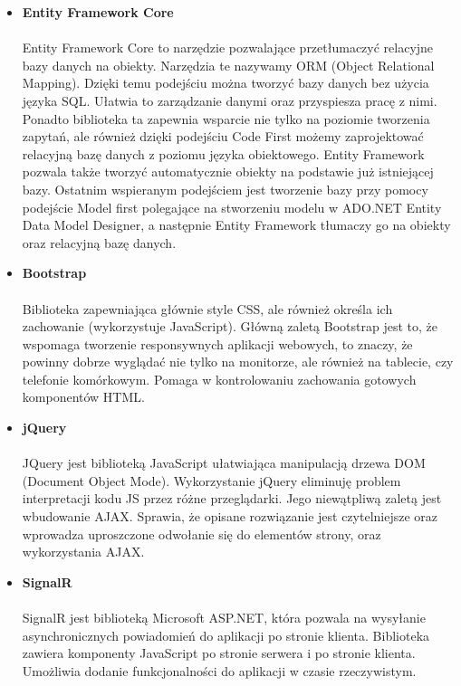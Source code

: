 \documentclass{article}
\begin{document}
\begin{itemize}
\item \textbf{Entity Framework Core} \\\\
Entity Framework Core to narzędzie pozwalające przetłumaczyć relacyjne bazy danych na obiekty. Narzędzia
te nazywamy ORM (Object Relational Mapping). Dzięki temu podejściu można tworzyć bazy danych bez użycia języka SQL. Ułatwia to zarządzanie danymi oraz przyspiesza pracę z nimi. Ponadto biblioteka ta zapewnia wsparcie nie tylko na poziomie tworzenia zapytań, ale również dzięki podejściu Code First możemy zaprojektować relacyjną bazę danych z poziomu języka obiektowego. Entity Framework pozwala także tworzyć automatycznie obiekty na podstawie już istniejącej bazy. Ostatnim wspieranym podejściem jest tworzenie bazy przy pomocy podejście Model first polegające na stworzeniu modelu w ADO.NET Entity Data Model Designer, a następnie Entity Framework tłumaczy go na obiekty oraz relacyjną bazę danych.

\item \textbf{Bootstrap} \\\\
Biblioteka zapewniająca głównie style CSS, ale również określa ich zachowanie (wykorzystuje JavaScript). Główną zaletą Bootstrap jest to, że wspomaga tworzenie responsywnych aplikacji webowych, to znaczy, że powinny dobrze wyglądać nie tylko na monitorze, ale również na tablecie, czy telefonie komórkowym. Pomaga w kontrolowaniu zachowania gotowych komponentów HTML.

\item \textbf{jQuery} \\\\
JQuery jest biblioteką JavaScript ułatwiająca manipulacją drzewa DOM (Document Object Mode).
Wykorzystanie jQuery eliminuję problem interpretacji kodu JS przez różne przeglądarki. Jego niewątpliwą
zaletą jest wbudowanie AJAX. Sprawia, że opisane rozwiązanie jest czytelniejsze oraz wprowadza uproszczone
odwołanie się do elementów strony, oraz wykorzystania AJAX.

\item \textbf{SignalR} \\\\
SignalR jest biblioteką Microsoft ASP.NET, która pozwala na wysyłanie asynchronicznych powiadomień do aplikacji po stronie klienta. Biblioteka zawiera komponenty JavaScript po stronie serwera i po stronie klienta. Umożliwia dodanie funkcjonalności do aplikacji w czasie rzeczywistym. 
\end{itemize}
\end{document}
